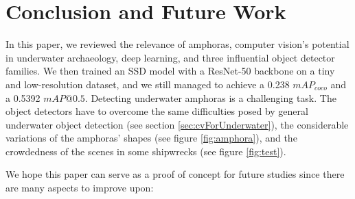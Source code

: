 \documentclass[a4paper, 11pt, oneside]{article}
\begin{document}
\clearpage

\section{Conclusion and Future Work}

In this paper, we reviewed the relevance of amphoras, computer vision's potential in underwater archaeology, deep
learning, and three influential object detector families. We then trained an SSD model with a ResNet-50 backbone on a
tiny and low-resolution dataset, and we still managed to achieve a 0.238 $mAP_{coco}$ and a 0.5392 $mAP@0.5$. Detecting
underwater amphoras is a challenging task. The object detectors have to overcome the same difficulties posed by general
underwater object detection (see section \ref{sec:cvForUnderwater}), the considerable variations of the amphoras' shapes
(see figure \ref{fig:amphora}), and the crowdedness of the scenes in some shipwrecks (see figure \ref{fig:test}).

We hope this paper can serve as a proof of concept for future studies since there are many aspects to improve upon:
\end{document}
